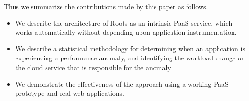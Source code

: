 Thus we summarize the contributions made by this paper as follows.
\begin{itemize}
\item We describe the architecture of Roots as an intrinsic PaaS
service, which works automatically without depending upon
application instrumentation.
\item We describe a statistical methodology for determining when an
application is experiencing a performance anomaly, and identifying the 
workload change or the cloud service that is responsible for the anomaly.
\item We demonstrate the effectiveness of the approach using a working PaaS
prototype and real web applications.
\end{itemize}

